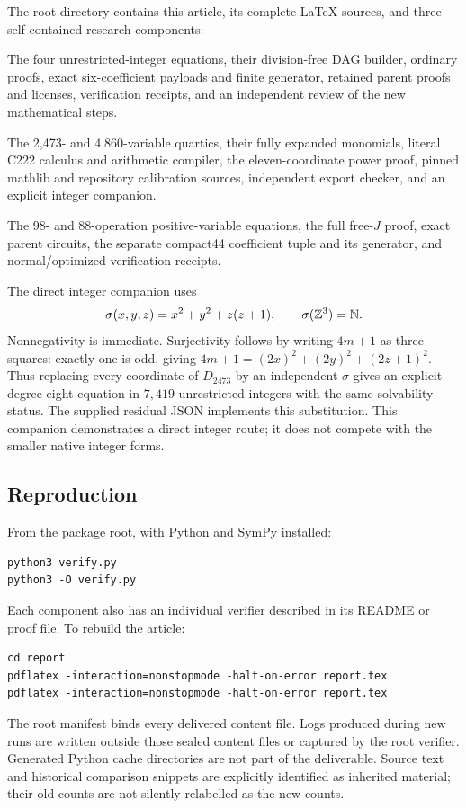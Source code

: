The root directory contains this article, its complete LaTeX sources,
and three self-contained research components:
\begin{description}[style=nextline,leftmargin=2em]
\item[\texttt{integer/}]
The four unrestricted-integer equations, their division-free DAG builder,
ordinary proofs, exact six-coefficient payloads and finite generator,
retained parent proofs and licenses, verification receipts, and an
independent review of the new mathematical steps.
\item[\texttt{direct/}]
The 2,473- and 4,860-variable quartics, their fully expanded monomials,
literal C222 calculus and arithmetic compiler, the eleven-coordinate
power proof, pinned mathlib and repository calibration sources,
independent export checker, and an explicit integer companion.
\item[\texttt{positive/}]
The 98- and 88-operation positive-variable equations, the full free-$J$
proof, exact parent circuits, the separate compact44 coefficient tuple
and its generator, and normal/optimized verification receipts.
\end{description}

The direct integer companion uses
\[
 \sigma(x,y,z)=x^2+y^2+z(z+1),\qquad\sigma(\mathbb Z^3)=\mathbb N.
\]
Nonnegativity is immediate. Surjectivity follows by writing $4m+1$ as
three squares: exactly one is odd, giving
$4m+1=(2x)^2+(2y)^2+(2z+1)^2$.
Thus replacing every coordinate of $D_{2473}$ by an independent $\sigma$
gives an explicit degree-eight equation in $7,419$ unrestricted integers
with the same solvability status. The supplied residual JSON implements
this substitution. This companion demonstrates a direct integer route;
it does not compete with the smaller native integer forms.

\subsection*{Reproduction}
From the package root, with Python and SymPy installed:
\begin{lstlisting}
python3 verify.py
python3 -O verify.py
\end{lstlisting}
Each component also has an individual verifier described in its README
or proof file. To rebuild the article:
\begin{lstlisting}
cd report
pdflatex -interaction=nonstopmode -halt-on-error report.tex
pdflatex -interaction=nonstopmode -halt-on-error report.tex
\end{lstlisting}
The root manifest binds every delivered content file. Logs produced during
new runs are written outside those sealed content files or captured by
the root verifier. Generated Python cache directories are not part of the
deliverable. Source text and historical comparison snippets are explicitly
identified as inherited material; their old counts are not silently
relabelled as the new counts.

